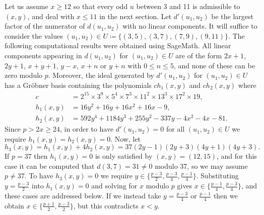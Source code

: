 \documentclass[11pt,a4paper,reqno]{amsart}
\theoremstyle{definition}
\numberwithin{equation}{section}
\begin{document}
Let us assume $x\geq12$ so that every odd $u$ between 3 and 11 is admissible to $(x,y)$, and deal with $x\leq11$ in the next section. Let $d'(u_1,u_2)$ be the largest factor of the numerator of $d(u_1,u_2)$ with no linear components. It will suffice to consider the values $(u_1,u_2)\in U\coloneqq\{(3,5),(3,7),(7,9),(9,11)\}$. The following computational results were obtained using SageMath. All linear components appearing in $d(u_1,u_2)$ for $(u_1,u_2)\in U$ are of the form $2x+1$, $2y+1$, $x+y+1$, $y-x$, $x+n$ or $y+n$ with $0\leq n\leq 5$, and none of these can be zero modulo $p$. Moreover, the ideal generated by $d'(u_1,u_2)$ for $(u_1,u_2)\in U$ has a Gr\"obner basis containing the polynomials $c h_1(x,y)$ and $c h_2(x,y)$ where
\begin{align*}
c&= 2^{15}\times3^9\times5^4\times7^3\times11^2\times13^3\times17^2\times19,\\
h_1(x,y)&= 16y^2 + 16y + 16x^2 + 16x - 9,\\
h_2(x,y)&= 592y^4 + 1184y^3 + 255y^2 - 337y - 4x^2 - 4x - 81.
\end{align*}
Since $p>2x\geq24$, in order to have $d'(u_1,u_2)=0$ for all $(u_1,u_2)\in U$ we require $h_1(x,y)=h_2(x,y)=0$. Now, let
\[h_3(x,y)=h_1(x,y)+4h_2(x,y)=37(2y-1)(2y+3)(4y+1)(4y+3).\]
If $p=37$ then $h_1(x,y)=0$ is only satisfied by $(x,y)=(12,15)$, and for this case it can be computed that $d(3,7)=31\neq0$ modulo 37, so we may assume $p\neq37$. To have $h_3(x,y)=0$ we require $y\in\{\frac{p-3}2,\frac{p-3}4,\frac{p-1}4\}$. Substituting $y=\frac{p-3}2$ into $h_1(x,y)=0$ and solving for $x$ modulo $p$ gives $x\in\{\frac{p-1}4,\frac{p-3}4\}$, and these cases are addressed below. If we instead take $y=\frac{p-3}4$ or $\frac{p-1}4$ then we obtain $x\in\{\frac{p+1}2,\frac{p-3}2\}$, but this contradicts $x<y$.
\end{document}
